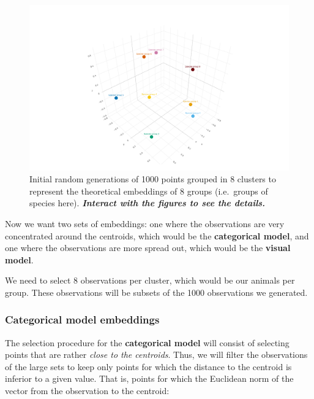 \documentclass[
  authoryear]{elsarticle}
\begin{document}
\begin{figure}
\begin{minipage}{0.50\linewidth}
{\includegraphics{index_files/figure-pdf/fig-perfect-embeddings-2.png}

}


\end{minipage}%

\caption{\label{fig-perfect-embeddings}Initial random generations of
1000 points grouped in 8 clusters to represent the theoretical
embeddings of 8 groups (i.e.~groups of species here).
\textbf{\emph{Interact with the figures to see the details.}}}

\end{figure}%

Now we want two sets of embeddings: one where the observations are very
concentrated around the centroids, which would be the
\textbf{categorical model}, and one where the observations are more
spread out, which would be the \textbf{visual model}.

We need to select 8 observations per cluster, which would be our animals
per group. These observations will be subsets of the 1000 observations
we generated.

\subsubsection{Categorical model
embeddings}\label{categorical-model-embeddings}

The selection procedure for the \textbf{categorical model} will consist
of selecting points that are rather \emph{close to the centroids}. Thus,
we will filter the observations of the large sets to keep only points
for which the distance to the centroid is inferior to a given value.
That is, points for which the Euclidean norm of the vector from the
observation to the centroid:
\end{document}
